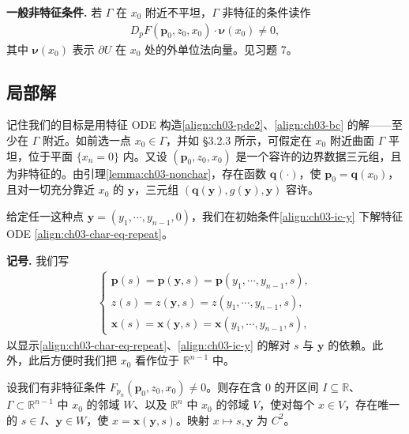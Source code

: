 \documentclass[../../main.tex]{subfiles}
\begin{document}
\textbf{一般非特征条件.} 若 $\Gamma$ 在 $x_0$ 附近不平坦，$\Gamma$ 非特征的条件读作
\begin{align}\label{align:ch03-nonchar-general}
D_p F(\mathbf{p}_0,z_0,x_0)\cdot\boldsymbol{\nu}(x_0)\neq 0,
\end{align}
其中 $\boldsymbol{\nu}(x_0)$ 表示 $\partial U$ 在 $x_0$ 处的外单位法向量。见习题 7。

\subsection{局部解}\label{subsection:ch03-local}

记住我们的目标是用特征 ODE 构造\eqref{align:ch03-pde2}、\eqref{align:ch03-bc} 的解——至少在 $\Gamma$ 附近。如前选一点 $x_0\in\Gamma$，并如 \S3.2.3 所示，可假定在 $x_0$ 附近曲面 $\Gamma$ 平坦，位于平面 $\{x_n=0\}$ 内。又设 $(\mathbf{p}_0,z_0,x_0)$ 是一个容许的边界数据三元组，且为非特征的。由引理\cref{lemma:ch03-nonchar}，存在函数 $\mathbf{q}(\cdot)$，使 $\mathbf{p}_0=\mathbf{q}(x_0)$，且对一切充分靠近 $x_0$ 的 $\mathbf{y}$，三元组 $(\mathbf{q}(\mathbf{y}),g(\mathbf{y}),\mathbf{y})$ 容许。

给定任一这种点 $\mathbf{y}=(y_1,\cdots,y_{n-1},0)$，我们在初始条件\eqref{align:ch03-ic-y} 下解特征 ODE \eqref{align:ch03-char-eq-repeat}。

\textbf{记号.} 我们写
\begin{align*}
\begin{cases}
\mathbf{p}(s)=\mathbf{p}(\mathbf{y},s)=\mathbf{p}(y_1,\cdots,y_{n-1},s),\\
z(s)=z(\mathbf{y},s)=z(y_1,\cdots,y_{n-1},s),\\
\mathbf{x}(s)=\mathbf{x}(\mathbf{y},s)=\mathbf{x}(y_1,\cdots,y_{n-1},s),
\end{cases}
\end{align*}
以显示\eqref{align:ch03-char-eq-repeat}、\eqref{align:ch03-ic-y} 的解对 $s$ 与 $\mathbf{y}$ 的依赖。此外，此后方便时我们把 $x_0$ 看作位于 $\mathbb{R}^{n-1}$ 中。

\begin{lemma}[局部可逆性]\label{lemma:ch03-local-inv}设我们有非特征条件 $F_{p_n}(\mathbf{p}_0,z_0,x_0)\neq 0$。则存在含 0 的开区间 $I\subseteq\mathbb{R}$、$\Gamma\subset\mathbb{R}^{n-1}$ 中 $x_0$ 的邻域 $W$、以及 $\mathbb{R}^n$ 中 $x_0$ 的邻域 $V$，使对每个 $x\in V$，存在唯一的 $s\in I$、$\mathbf{y}\in W$，使 $x=\mathbf{x}(\mathbf{y},s)$。映射 $x\mapsto s,\mathbf{y}$ 为 $C^2$。
\end{lemma}
\end{document}
